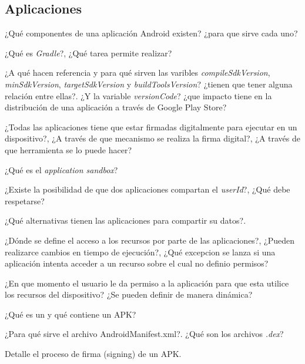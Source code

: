 \begin{questions}
\end{questions}

\subsection{Aplicaciones}
\begin{questions}
  \question ¿Qué componentes de una aplicación Android existen? ¿para que sirve cada uno?

  \question ¿Qué es \textit{Gradle}?, ¿Qué tarea permite realizar?
  
  \question ¿A qué hacen referencia y para qué sirven las varibles \textit{compileSdkVersion}, \textit{minSdkVersion}, \textit{targetSdkVersion} y \textit{buildToolsVersion}? ¿tienen que tener alguna relación entre ellas?. ¿Y la variable \textit{versionCode}? ¿que impacto tiene en la distribución de una aplicación a través de Google Play Store?

  \question ¿Todas las aplicaciones tiene que estar firmadas digitalmente para ejecutar en un dispositivo?, ¿A través de que mecanismo se realiza la firma digital?, ¿A través de que herramienta se lo puede hacer?
  
  \question ¿Qué es el \textit{application sandbox}?
  
  \question ¿Existe la posibilidad de que dos aplicaciones compartan el \textit{userId}?, ¿Qué debe respetarse?
  
  \question ¿Qué alternativas tienen las aplicaciones para compartir su datos?.
  
  \question ¿Dónde se define el acceso a los recursos por parte de las aplicaciones?, ¿Pueden realizarce cambios en tiempo de ejecución?, ¿Qué excepcion se lanza si una aplicación intenta acceder a un recurso sobre el cual no definio permisos?
  
  \question ¿En que momento el usuario le da permiso a la aplicación para que esta utilice los recursos del dispositivo? ¿Se pueden definir de manera dinámica?

  \question ¿Qué es un y qué contiene un APK?

  \question ¿Para qué sirve el archivo AndroidManifest.xml?. ¿Qué son los archivos \textit{.dex}?

  \question Detalle el proceso de firma (signing) de un APK.
\end{questions}

